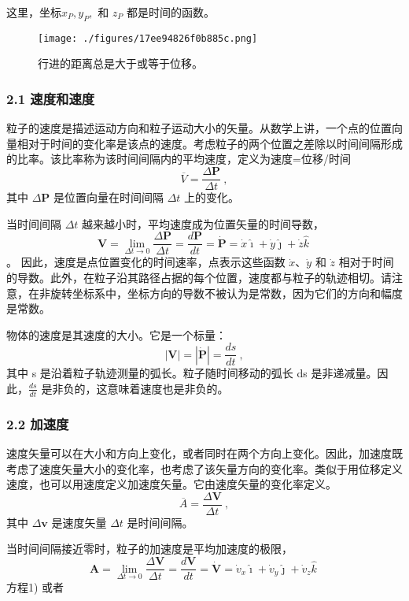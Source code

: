 这里，坐标$x_P, y_P,$ 和 $z_P$ 都是时间的函数。

\begin{figure}[ht]
\centering
\texttt{[image: ./figures/17ee94826f0b885c.png]}
\caption{行进的距离总是大于或等于位移。} \label{fig_YDX_7}
\end{figure}

\subsubsection{2.1 速度和速度}

粒子的速度是描述运动方向和粒子运动大小的矢量。从数学上讲，一个点的位置向量相对于时间的变化率是该点的速度。考虑粒子的两个位置之差除以时间间隔形成的比率。该比率称为该时间间隔内的平均速度，定义为速度=位移/时间
$$\overline{V} = \frac{\Delta \mathbf{P}}{\Delta t}~,$$
其中 $\Delta \mathbf{P}$ 是位置向量在时间间隔 $\Delta t$ 上的变化。

当时间间隔 $\Delta t$ 越来越小时，平均速度成为位置矢量的时间导数，
$$\mathbf {V} = \lim_{\Delta t \to 0} \frac{\Delta \mathbf{P}}{\Delta t} = \frac{d \mathbf{P}}{dt} = \dot{\mathbf{P}} = \dot{x}\hat{\imath} + \dot{y}\hat{\jmath} + \dot{z}\hat{k}~$$。
因此，速度是点位置变化的时间速率，点表示这些函数 $\dot{x}$、$\dot{y}$ 和 $\dot{z}$ 相对于时间的导数。此外，在粒子沿其路径占据的每个位置，速度都与粒子的轨迹相切。请注意，在非旋转坐标系中，坐标方向的导数不被认为是常数，因为它们的方向和幅度是常数。

物体的速度是其速度的大小。它是一个标量：
$$\left| \mathbf{V} \right| = \left| \dot{\mathbf{P}} \right| = \frac{ds}{dt}~,$$
其中 s 是沿着粒子轨迹测量的弧长。粒子随时间移动的弧长 ds 是非递减量。因此，$\frac{ds}{dt}$ 是非负的，这意味着速度也是非负的。

\subsubsection{2.2 加速度}

速度矢量可以在大小和方向上变化，或者同时在两个方向上变化。因此，加速度既考虑了速度矢量大小的变化率，也考虑了该矢量方向的变化率。类似于用位移定义速度，也可以用速度定义加速度矢量。它由速度矢量的变化率定义。
$$\overline{A} = \frac{\Delta \mathbf{V}}{\Delta t}~,$$
其中 $\Delta \mathbf{v}$ 是速度矢量 $\Delta t$ 是时间间隔。

当时间间隔接近零时，粒子的加速度是平均加速度的极限，
$$\mathbf {A} = \lim_{\Delta t \to 0} \frac{\Delta \mathbf{V}}{\Delta t} = \frac{d \mathbf{V}}{dt} = \dot{\mathbf{V}} = \dot{v}_x\hat{\imath} + \dot{v}_y\hat{\jmath} + \dot{v}_z\hat{k}~$$方程1)
或者

